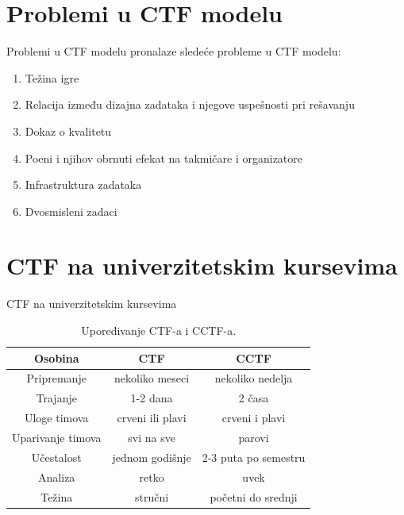 \documentclass[aspectratio=169,xcolor=dvipsnames]{beamer}
\begin{document}
\section{Problemi u CTF modelu}

\begin{frame}{Problemi u CTF modelu}
    \cite{ctfchung} pronalaze sledeće probleme u CTF modelu:
    \begin{enumerate}
        \item Težina igre
        \item Relacija između dizajna zadataka i njegove uspešnosti pri
            rešavanju
        \item Dokaz o kvalitetu
        \item Poeni i njihov obrnuti efekat na takmičare i organizatore
        \item Infrastruktura zadataka
        \item Dvosmisleni zadaci
    \end{enumerate}
\end{frame}

\section{CTF na univerzitetskim kursevima}

\begin{frame}{CTF na univerzitetskim kursevima}
    \begin{table}[!h]
        \centering
        \begin{tabular}{|c|c|c|}
            \hline
            \textbf{Osobina} & \textbf{CTF} & \textbf{CCTF} \\
            \hline
            \hline
            Pripremanje & nekoliko meseci & nekoliko nedelja \\
            Trajanje & 1-2 dana & 2 časa \\
            Uloge timova & crveni ili plavi & crveni i plavi \\
            Uparivanje timova & svi na sve & parovi \\
            Učestalost & jednom godišnje & 2-3 puta po semestru \\
            Analiza & retko & uvek \\
            Težina & stručni & početni do srednji \\
            \hline
        \end{tabular}
        \caption{Upoređivanje CTF-a i CCTF-a.\cite{ctfclass}}\label{tab:cctf}
    \end{table}
\end{frame}
\end{document}
